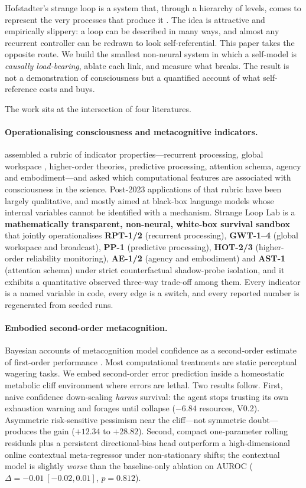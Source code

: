 \documentclass[11pt,a4paper]{article}
\begin{document}
Hofstadter's strange loop is a system that, through a hierarchy of levels, comes to represent the very processes that produce it \citep{hofstadter1979geb,hofstadter2007loop}. The idea is attractive and empirically slippery: a loop can be described in many ways, and almost any recurrent controller can be redrawn to look self-referential. This paper takes the opposite route. We build the smallest non-neural system in which a self-model is \emph{causally load-bearing}, ablate each link, and measure what breaks. The result is not a demonstration of consciousness but a quantified account of what self-reference costs and buys.

The work sits at the intersection of four literatures.

\paragraph{Operationalising consciousness and metacognitive indicators.}
\citet{butlin2025indicators} assembled a rubric of indicator properties---recurrent processing, global workspace \citep{baars1988cognitive}, higher-order theories, predictive processing, attention schema, agency and embodiment---and asked which computational features are associated with consciousness in the science. Post-2023 applications of that rubric have been largely qualitative, and mostly aimed at black-box language models whose internal variables cannot be identified with a mechanism. Strange Loop Lab is a \textbf{mathematically transparent, non-neural, white-box survival sandbox} that jointly operationalises \textbf{RPT-1/2} (recurrent processing), \textbf{GWT-1--4} (global workspace and broadcast), \textbf{PP-1} (predictive processing), \textbf{HOT-2/3} (higher-order reliability monitoring), \textbf{AE-1/2} (agency and embodiment) and \textbf{AST-1} (attention schema) under strict counterfactual shadow-probe isolation, and it exhibits a quantitative observed three-way trade-off among them. Every indicator is a named variable in code, every edge is a switch, and every reported number is regenerated from seeded runs.

\paragraph{Embodied second-order metacognition.}
Bayesian accounts of metacognition model confidence as a second-order estimate of first-order performance \citep{fleming2017self,pasquali2010know}. Most computational treatments are static perceptual wagering tasks. We embed second-order error prediction inside a homeostatic metabolic cliff environment where errors are lethal. Two results follow. First, naive confidence down-scaling \emph{harms} survival: the agent stops trusting its own exhaustion warning and forages until collapse ($-6.84$ resources, V0.2). Asymmetric risk-sensitive pessimism near the cliff---not symmetric doubt---produces the gain ($+12.34$ to $+28.82$). Second, compact one-parameter rolling residuals plus a persistent directional-bias head outperform a high-dimensional online contextual meta-regressor under non-stationary shifts; the contextual model is slightly \emph{worse} than the baseline-only ablation on AUROC ($\Delta=-0.01\ [-0.02,0.01]$, $p=0.812$).
\end{document}
